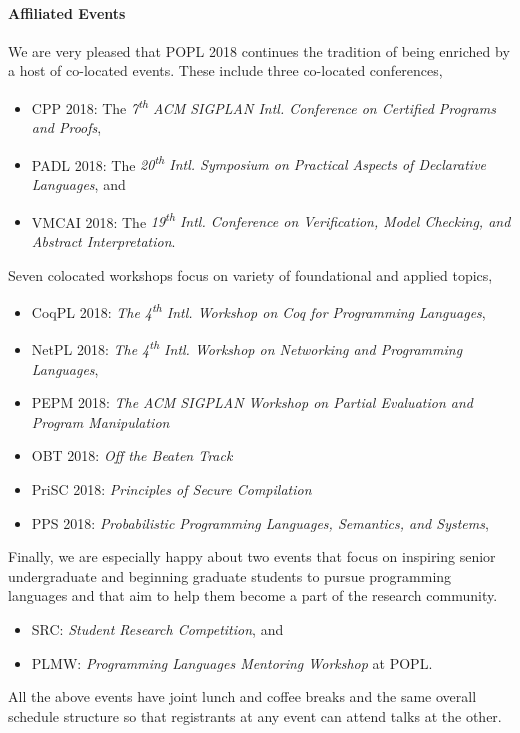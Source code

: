 \paragraph{Affiliated Events}
%
We are very pleased that POPL 2018 continues the tradition of being enriched
by a host of co-located events.
%
These include three co-located conferences,
%
\begin{itemize}
  \item CPP 2018:   The \emph{7\textsuperscript{th} ACM SIGPLAN Intl. Conference on Certified Programs and Proofs},
  \item PADL 2018:  The \emph{20\textsuperscript{th} Intl. Symposium on Practical Aspects of Declarative Languages}, and
  \item VMCAI 2018: The \emph{19\textsuperscript{th} Intl. Conference on Verification, Model Checking, and Abstract Interpretation}.
\end{itemize}
%
Seven colocated workshops focus on variety of foundational and applied topics,
%
\begin{itemize}
  \item CoqPL 2018: \emph{The 4\textsuperscript{th} Intl. Workshop on Coq for Programming Languages},
  \item NetPL 2018: \emph{The 4\textsuperscript{th} Intl. Workshop on Networking and Programming Languages},
  \item PEPM 2018:  \emph{The ACM SIGPLAN Workshop on Partial Evaluation and Program Manipulation}
  \item OBT 2018:   \emph{Off the Beaten Track}
  \item PriSC 2018: \emph{Principles of Secure Compilation}
  \item PPS 2018:   \emph{Probabilistic Programming Languages, Semantics, and Systems},
\end{itemize}
%
Finally, we are especially happy about two events that
focus on inspiring senior undergraduate and beginning
graduate students to pursue programming languages and
that aim to help them become a part of the research
community.
%
\begin{itemize}
\item SRC: \emph{Student Research Competition}, and
\item PLMW: \emph{Programming Languages Mentoring Workshop} at POPL.
\end{itemize}
%
All the above events have joint lunch and coffee breaks
and the same overall schedule structure so that registrants
at any event can attend talks at the other.

